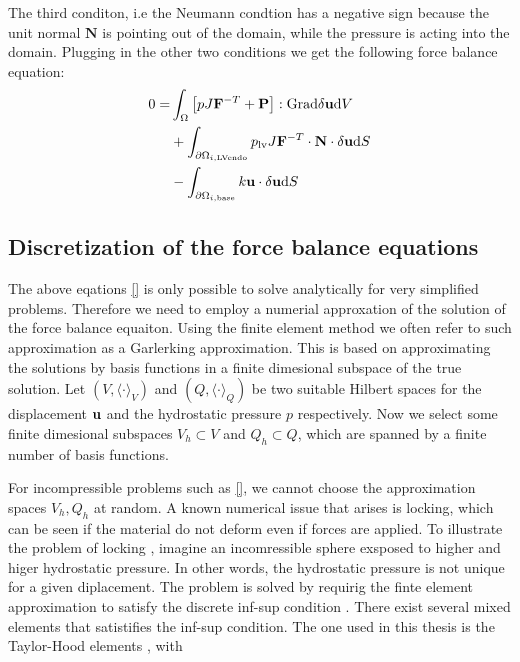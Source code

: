 The third conditon, i.e the Neumann condtion has a negative sign because the unit normal
$\mathbf{N}$ is pointing out of the domain, while the pressure is
acting into the domain. Plugging in the other two conditions we get the following
force balance equation:
\begin{align}
  \begin{split}
    0 
  =&  \int_{\Omega}  \left[ pJ \mathbf{F}^{-T} + \mathbf{P} \right] : \mathrm{Grad} \delta \mathbf{u} \mathrm{d}V \\
  &+ \int_{\partial  \Omega_{i, \mathrm{LV endo}}} p_{\mathrm{lv}} J\mathbf{F}^{-T} \cdot \mathbf{N} \cdot \delta \mathbf{u} \mathrm{d}S \\
  &- \int_{ \partial \Omega_{i, \mathrm{base}}} k \mathbf{u} \cdot \delta \mathbf{u} \mathrm{d}S
  \end{split}
\end{align}



\subsection{Discretization of the force balance equations}

The above eqations \eqref{} is only possible to solve analytically for
very simplified problems. Therefore we need to employ a numerial
approxation of the solution of the force balance equaiton. Using the
finite element method we often refer to such approximation as a
Garlerking approximation. This is based on approximating the solutions
by basis functions in a finite dimesional subspace of the true
solution. Let $(V, \langle \cdot \rangle_V)$
and $(Q, \langle \cdot \rangle_Q)$ be two suitable Hilbert
spaces for the displacement $\mathbf{u}$ and the hydrostatic pressure $p$
respectively. Now we select some finite dimesional subspaces $V_h
\subset V$ and $Q_h \subset Q$, which are spanned by a finite number
of basis functions.

For incompressible problems such as \eqref{}, we cannot choose the
approximation spaces $V_h, Q_h$ at random. A known numerical issue
that arises is locking, which can be seen if the material do not
deform even if forces are applied. To illustrate the problem of
locking , imagine an incomressible sphere exsposed to higher and higer
hydrostatic pressure. In other words, the hydrostatic pressure is not
unique for a given diplacement. The problem is solved by requirig the
finte element approximation to satisfy the discrete inf-sup condition
\cite{arnold1984stable}. There exist several mixed elements that
satistifies the inf-sup condition. The one used in this thesis is the
Taylor-Hood elements \cite{taylor1973numerical}, with


